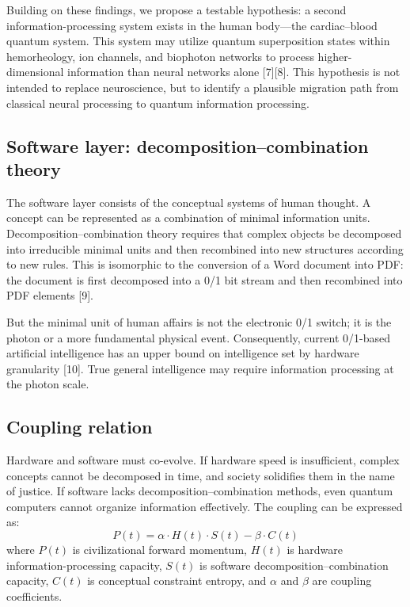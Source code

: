 \documentclass[11pt,a4paper]{article}
\begin{document}
Building on these findings, we propose a testable hypothesis: a second information-processing system exists in the human body---the cardiac--blood quantum system. This system may utilize quantum superposition states within hemorheology, ion channels, and biophoton networks to process higher-dimensional information than neural networks alone [7][8]. This hypothesis is not intended to replace neuroscience, but to identify a plausible migration path from classical neural processing to quantum information processing.

\subsection{Software layer: decomposition--combination theory}

The software layer consists of the conceptual systems of human thought. A concept can be represented as a combination of minimal information units. Decomposition--combination theory requires that complex objects be decomposed into irreducible minimal units and then recombined into new structures according to new rules. This is isomorphic to the conversion of a Word document into PDF: the document is first decomposed into a 0/1 bit stream and then recombined into PDF elements [9].

But the minimal unit of human affairs is not the electronic 0/1 switch; it is the photon or a more fundamental physical event. Consequently, current 0/1-based artificial intelligence has an upper bound on intelligence set by hardware granularity [10]. True general intelligence may require information processing at the photon scale.

\subsection{Coupling relation}

Hardware and software must co-evolve. If hardware speed is insufficient, complex concepts cannot be decomposed in time, and society solidifies them in the name of justice. If software lacks decomposition--combination methods, even quantum computers cannot organize information effectively. The coupling can be expressed as:
\begin{equation}
P(t) = \alpha \cdot H(t) \cdot S(t) - \beta \cdot C(t)
\end{equation}
where $P(t)$ is civilizational forward momentum, $H(t)$ is hardware information-processing capacity, $S(t)$ is software decomposition--combination capacity, $C(t)$ is conceptual constraint entropy, and $\alpha$ and $\beta$ are coupling coefficients.
\end{document}
